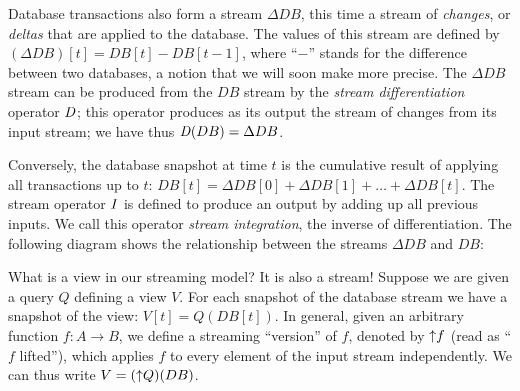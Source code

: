 Database transactions also form a stream $\Delta DB$, this time a
stream of \emph{changes}, or \emph{deltas} that are applied to the
database.  The values of this stream are defined by $(\Delta DB)[t] =
DB[t] - DB[t-1]$, where ``$-$'' stands for the difference between two
databases, a notion that we will soon make more precise.  The $\Delta
DB$ stream can be produced from the $DB$ stream by the \emph{stream
differentiation} operator $\mathit{D}$; this operator produces as its output
the stream of changes from its input stream; we have thus $\mathit{D}(DB) =
\Delta DB$.

Conversely, the database snapshot at time $t$ is the cumulative result
of applying all transactions up to $t$: $DB[t] = \Delta DB[0] + \Delta
DB[1] + \ldots + \Delta DB[t]$.  The stream operator $\mathit{I}$ is defined
to produce an output by adding up all previous inputs.  We call this
operator \emph{stream integration}, the inverse of differentiation.
The following diagram shows the relationship between the streams
$\Delta DB$ and $DB$:
\begin{center}
\end{center}

What is a view in our streaming model?  It is also a stream!  Suppose
we are given a query $Q$ defining a view $V$.  For each snapshot of
the database stream we have a snapshot of the view: $V[t] = Q(DB[t])$.
In general, given an arbitrary function $f: A \to B$, we define a
streaming ``version'' of $f$, denoted by ${\uparrow}f$ (read as ``$f$
lifted''), which applies $f$ to every element of the input stream
independently.  We can thus write $V = ({\uparrow}Q)(DB)$.

